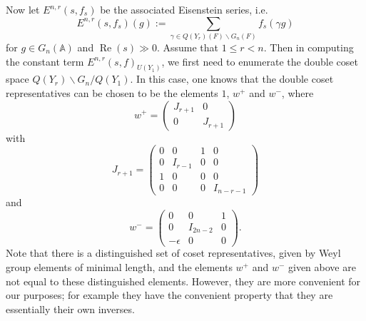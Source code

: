 \documentclass[10pt]{amsart}
\theoremstyle{plain}
\numberwithin{equation}{section}
\begin{document}
 Now let $E^{n,r}(s, f_s)$ be the associated Eisenstein series, i.e.
\[
E^{n,r}(s, f_s)(g):=\sum_{\gamma\in Q(Y_r)(F)\backslash G_n(F)}f_s(\gamma g)
\]
for $g\in G_n({\mathbb{A}})$ and $\operatorname{Re}(s) \gg 0$. Assume that $1 \leq r < n$. Then in computing the constant term
 $ E^{n,r}(s,f)_{U(Y_1)}$, we first need to enumerate the double coset
 space $Q(Y_r) \backslash G_n / Q(Y_1)$. In this case, one knows that
 the double coset representatives can be chosen to be the elements
 $1$, $w^+$ and $w^-$,  where
  \[  w^+ = \left( \begin{array}{cc}
J_{r+1}   & 0 \\
0 & J_{r+1}  \end{array}\right)  \]
with
\[  J_{r+1} = \left( \begin{array}{cccc}
0 & 0 & 1 & 0   \\
 0 & I_{r-1} & 0 &  0    \\
 1  & 0 & 0     & 0 \\
 0 & 0 & 0 &  I_{n-r-1} \end{array} \right) \]  
 and
 \[  w^-  =  \left( \begin{array}{ccc}
 0 & 0 & 1 \\
 0 & I_{2n-2} & 0 \\
 -\epsilon &  0 & 0 \end{array} \right). \]
Note that there is a distinguished set of coset representatives, given
by Weyl group elements of minimal length, and the elements $w^+$ and
$w^-$ given above are not equal to these distinguished
elements. However, they are more convenient for our purposes; for
example they have the convenient property that they are essentially their own
inverses. 
\vskip 10pt
\end{document}
